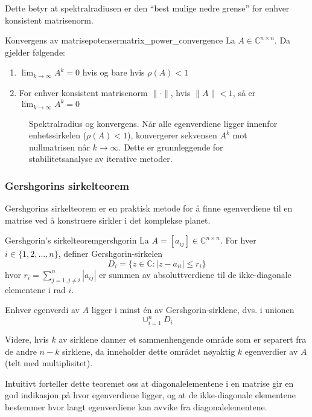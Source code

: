 \documentclass[../main.tex]{subfiles}
\begin{document}
Dette betyr at spektralradiusen er den \enquote{best mulige nedre grense} for enhver konsistent matrisenorm.

\begin{remark}{Konvergens av matrisepotenser}{matrix_power_convergence}
	La $A \in \mathbb{C}^{n \times n}$. Da gjelder følgende:
	\begin{enumerate}
		\item $\lim_{k \to \infty} A^k = 0$ hvis og bare hvis $\rho(A) < 1$
		\item For enhver konsistent matrisenorm $\|\cdot\|$, hvis $\|A\| < 1$, så er $\lim_{k \to \infty} A^k = 0$
	\end{enumerate}
\end{remark}

\begin{figure}
	\centering
	
	\caption{Spektralradius og konvergens. Når alle egenverdiene ligger innenfor enhetssirkelen ($\rho(A) < 1$), konvergerer sekvensen $A^k$ mot nullmatrisen når $k \to \infty$. Dette er grunnleggende for stabilitetsanalyse av iterative metoder.}
	\label{fig:spectral_radius}
\end{figure}

\subsubsection{Gershgorins sirkelteorem}
Gershgorins sirkelteorem er en praktisk metode for å finne egenverdiene til en matrise ved å konstruere sirkler i det komplekse planet.

\begin{theorem}{Gershgorin's sirkelteorem}{gershgorin}
	La $A = [a_{ij}] \in \mathbb{C}^{n \times n}$. For hver $i \in \{1,2,\ldots,n\}$, definer Gershgorin-sirkelen
	\[
		D_i = \{z \in \mathbb{C} : |z - a_{ii}| \leq r_i\}
	\]
	hvor $r_i = \sum_{j=1,j\neq i}^{n} |a_{ij}|$ er summen av absoluttverdiene til de ikke-diagonale elementene i rad $i$.

	Enhver egenverdi av $A$ ligger i minst én av Gershgorin-sirklene, dvs. i unionen
	\[
		\cup_{i=1}^{n} D_i
	\]

	Videre, hvis $k$ av sirklene danner et sammenhengende område som er separert fra de andre $n-k$ sirklene, da inneholder dette området nøyaktig $k$ egenverdier av $A$ (telt med multiplisitet).
\end{theorem}

Intuitivt forteller dette teoremet oss at diagonalelementene i en matrise gir en god indikasjon på hvor egenverdiene ligger, og at de ikke-diagonale elementene bestemmer hvor langt egenverdiene kan avvike fra diagonalelementene.
\end{document}

